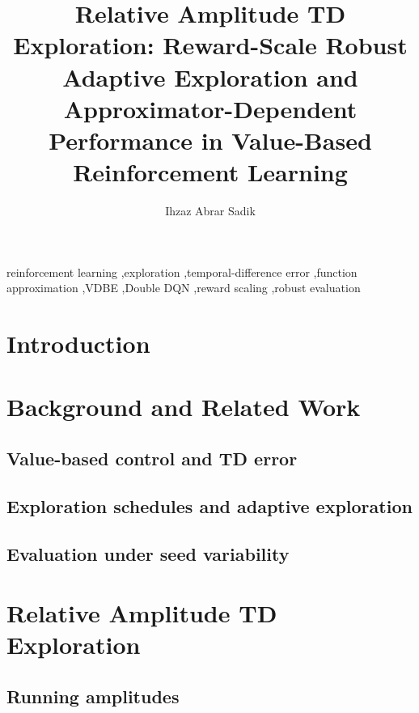 \documentclass[preprint,12pt]{elsarticle}
\begin{document}
\begin{frontmatter}

\title{Relative Amplitude TD Exploration: Reward-Scale Robust Adaptive Exploration and Approximator-Dependent Performance in Value-Based Reinforcement Learning}

\author[bracu]{Ihzaz Abrar Sadik}

\begin{abstract}

\end{abstract}

\begin{keyword}
reinforcement learning \sep exploration \sep temporal-difference error \sep function approximation \sep VDBE \sep Double DQN \sep reward scaling \sep robust evaluation
\end{keyword}

\end{frontmatter}

\section{Introduction}



\section{Background and Related Work}
\subsection{Value-based control and TD error}


\subsection{Exploration schedules and adaptive exploration}


\subsection{Evaluation under seed variability}

\section{Relative Amplitude TD Exploration}
\subsection{Running amplitudes}
\end{document}
